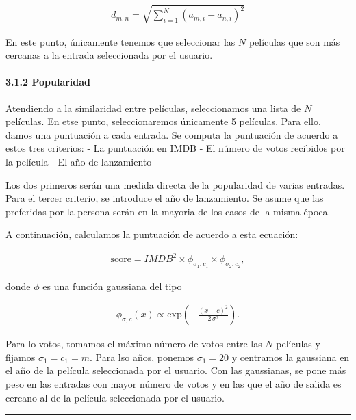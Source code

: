 \begin{eqnarray}
d_{m, n} = \sqrt{  \sum_{i = 1}^{N} \left( a_{m,i}  - a_{n,i} \right)^2  } 
\end{eqnarray}

En este punto, únicamente tenemos que seleccionar las \(N\) películas
que son más cercanas a la entrada seleccionada por el usuario.

\paragraph{3.1.2 Popularidad}\label{popularidad}

Atendiendo a la similaridad entre películas, seleccionamos una lista de
\(N\) películas. En etse punto, seleccionaremos únicamente 5 películas.
Para ello, damos una puntuación a cada entrada. Se computa la puntuación
de acuerdo a estos tres criterios: - La puntuación en IMDB - El número
de votos recibidos por la película - El año de lanzamiento

Los dos primeros serán una medida directa de la popularidad de varias
entradas. Para el tercer criterio, se introduce el año de lanzamiento.
Se asume que las preferidas por la persona serán en la mayoria de los
casos de la misma época.

A continuación, calculamos la puntuación de acuerdo a esta ecuación:

    \begin{eqnarray}
\mathrm{score} = IMDB^2 \times \phi_{\sigma_1, c_1} \times  \phi_{\sigma_2, c_2},
\end{eqnarray}

donde \(\phi\) es una función gaussiana del tipo

\begin{eqnarray}
\phi_{\sigma, c}(x) \propto \mathrm{exp}\left(-\frac{(x-c)^2}{2 \, \sigma^2}\right).
\end{eqnarray}

    Para lo votos, tomamos el máximo número de votos entre las \(N\)
películas y fijamos \(\sigma_1 = c_1 = m\). Para lso años, ponemos
\(\sigma_1 = 20\) y centramos la gaussiana en el año de la película
seleccionada por el usuario. Con las gaussianas, se pone más peso en las
entradas con mayor número de votos y en las que el año de salida es
cercano al de la película seleccionada por el usuario.

    \begin{center}\rule{0.5\linewidth}{\linethickness}\end{center}

